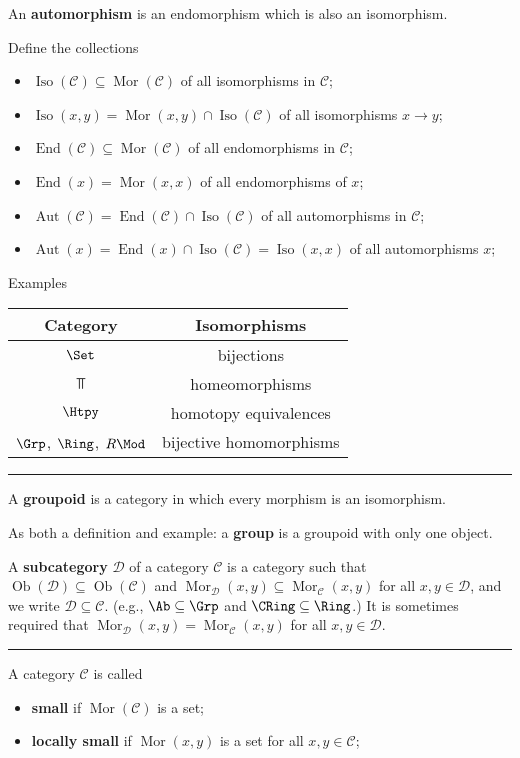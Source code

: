\documentclass[12pt]{article}
\newcommand{\keyword}[1]{\textbf{#1}}
\newcommand{\sepline}{\rule{\textwidth}{0.4pt}}
\theoremstyle{definition}
\newcommand{\CC}{\mathcal{C}}
\newcommand{\DD}{\mathcal{D}}
\newcommand{\<}{\left\langle}
\renewcommand{\>}{\right\rangle}
\newcommand{\seq}{\subseteq}
\DeclareMathOperator{\Ob}{Ob}
\DeclareMathOperator{\Mor}{Mor}
\DeclareMathOperator{\Iso}{Iso}
\DeclareMathOperator{\End}{End}
\DeclareMathOperator{\Aut}{Aut}
\begin{document}
An \keyword{automorphism} is an endomorphism which is also an isomorphism.

Define the collections
\begin{itemize}
    \item $\Iso(\CC) \seq \Mor(\CC)$ of all isomorphisms in $\CC$;
    \item $\Iso(x, y) = \Mor(x, y) \cap \Iso(\CC)$ of all isomorphisms $x \to y$;
    \item $\End(\CC) \seq \Mor(\CC)$ of all endomorphisms in $\CC$;
    \item $\End(x) = \Mor(x, x)$ of all endomorphisms of $x$;
    \item $\Aut(\CC) = \End(\CC) \cap \Iso(\CC)$ of all automorphisms in $\CC$;
    \item $\Aut(x) = \End(x) \cap \Iso(\CC) = \Iso(x, x)$ of all automorphisms $x$;
\end{itemize}

Examples
\begin{center}
    \begin{tabular}{c|c}
        Category & Isomorphisms \\\hline
        $\Set$ & bijections \\
        $\Top$ & homeomorphisms \\
        $\Htpy$ & homotopy equivalences \\
        $\Grp$, $\Ring$, $R\Mod$ & bijective homomorphisms
    \end{tabular}
\end{center}

\sepline

A \keyword{groupoid} is a category in which every morphism is an isomorphism.

As both a definition and example: a \keyword{group} is a groupoid with only one object.

A \keyword{subcategory} $\DD$ of a category $\CC$ is a category such that $\Ob(\DD) \seq \Ob(\CC)$ and $\Mor_\DD(x, y) \seq \Mor_\CC(x, y)$ for all $x, y \in \DD$, and we write $\DD \seq \CC$.
(e.g., $\Ab \seq \Grp$ and $\CRing \seq \Ring$.)
It is sometimes required that $\Mor_\DD(x, y) = \Mor_\CC(x, y)$ for all $x, y \in \DD$.

\sepline

A category $\CC$ is called
\begin{itemize}
    \item \keyword{small} if $\Mor(\CC)$ is a set;
    \item \keyword{locally small} if $\Mor(x, y)$ is a set for all $x, y \in \CC$; 
\end{itemize}
\end{document}
